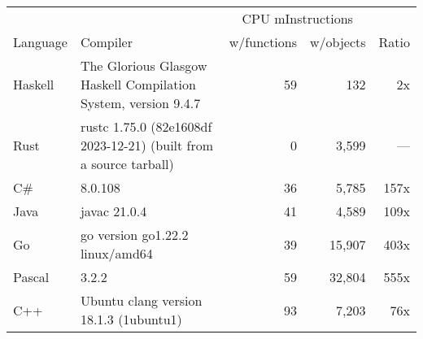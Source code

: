 \documentclass{article}
\begin{document}
      \begin{tabularx}{\linewidth}{lXrrr}
      \toprule
        & & \multicolumn{2}{c}{CPU mInstructions} & \\
        Language & Compiler & w/functions & w/objects & Ratio \\
      \midrule
    Haskell & The Glorious Glasgow Haskell Compilation System, version 9.4.7 & 59 & 132 & 2x \\
Rust & rustc 1.75.0 (82e1608df 2023-12-21) (built from a source tarball) & 0 & 3,599 & --- \\
C\# & 8.0.108 & 36 & 5,785 & 157x \\
Java & javac 21.0.4 & 41 & 4,589 & 109x \\
Go & go version go1.22.2 linux/amd64 & 39 & 15,907 & 403x \\
Pascal & 3.2.2 & 59 & 32,804 & 555x \\
C++ & Ubuntu clang version 18.1.3 (1ubuntu1) & 93 & 7,203 & 76x \\

      \bottomrule
      \end{tabularx}
      
\end{document}

